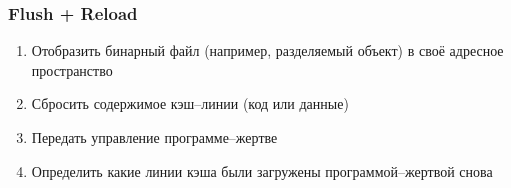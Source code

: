 




\subsubsection{Flush + Reload}
\begin{frame}{\insertsubsubsection}
  \begin{enumerate}
  \item Отобразить бинарный файл (например, разделяемый объект) в своё адресное
    пространство
  \item Сбросить содержимое кэш--линии (код или данные)
  \item Передать управление программе--жертве
  \item Определить какие линии кэша были загружены программой--жертвой снова
  \end{enumerate}

\end{frame}

